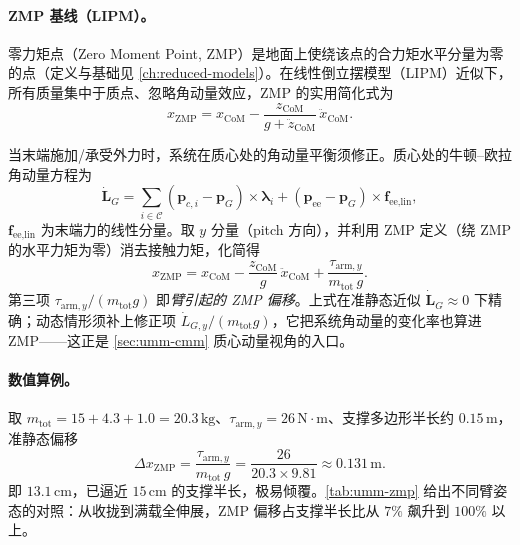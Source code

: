 \paragraph{ZMP 基线（LIPM）。}
零力矩点（Zero Moment Point, ZMP）是地面上使绕该点的合力矩水平分量为零的点（定义与基础见 \cref{ch:reduced-models}）。在线性倒立摆模型（LIPM）近似下，所有质量集中于质点、忽略角动量效应，ZMP 的实用简化式为
\begin{equation}
  x_{\text{ZMP}}=x_{\text{CoM}}-\frac{z_{\text{CoM}}}{g+\ddot z_{\text{CoM}}}\,\ddot x_{\text{CoM}}.
  \label{eq:umm-zmp-lipm}
\end{equation}

\begin{derivation}
当末端施加/承受外力时，系统在质心处的角动量平衡须修正。质心处的牛顿--欧拉角动量方程为
\begin{equation}
  \dot{\mathbf L}_G=\sum_{i\in\mathcal C}(\mathbf p_{c,i}-\mathbf p_G)\times\boldsymbol\lambda_i+(\mathbf p_{\text{ee}}-\mathbf p_G)\times\mathbf f_{\text{ee,lin}},
  \label{eq:umm-Ldot}
\end{equation}
$\mathbf f_{\text{ee,lin}}$ 为末端力的线性分量。取 $y$ 分量（pitch 方向），并利用 ZMP 定义（绕 ZMP 的水平力矩为零）消去接触力矩，化简得
\begin{equation}
  \boxed{\;
  x_{\text{ZMP}}=x_{\text{CoM}}-\frac{z_{\text{CoM}}}{g}\,\ddot x_{\text{CoM}}+\frac{\tau_{\text{arm},y}}{m_{\text{tot}}\,g}.
  \;}
  \label{eq:umm-zmp-arm}
\end{equation}
第三项 $\tau_{\text{arm},y}/(m_{\text{tot}}g)$ 即\emph{臂引起的 ZMP 偏移}。上式在准静态近似 $\dot{\mathbf L}_G\approx0$ 下精确；动态情形须补上修正项 $\dot L_{G,y}/(m_{\text{tot}}g)$，它把系统角动量的变化率也算进 ZMP——这正是 \cref{sec:umm-cmm} 质心动量视角的入口。
\end{derivation}

\paragraph{数值算例。}
取 $m_{\text{tot}}=15+4.3+1.0=20.3\,\mathrm{kg}$、$\tau_{\text{arm},y}=26\,\mathrm{N\!\cdot\!m}$、支撑多边形半长约 $0.15\,\mathrm{m}$，准静态偏移
\begin{equation}
  \Delta x_{\text{ZMP}}=\frac{\tau_{\text{arm},y}}{m_{\text{tot}}\,g}=\frac{26}{20.3\times9.81}\approx0.131\,\mathrm m.
  \label{eq:umm-zmp-num}
\end{equation}
即 $13.1\,\mathrm{cm}$，已逼近 $15\,\mathrm{cm}$ 的支撑半长，极易倾覆。\cref{tab:umm-zmp} 给出不同臂姿态的对照：从收拢到满载全伸展，ZMP 偏移占支撑半长比从 $7\%$ 飙升到 $100\%$ 以上。

